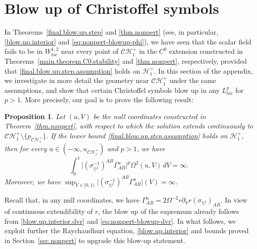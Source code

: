 \documentclass[10pt, reqno]{amsart}
\newtheorem{proposition}[theorem]{Proposition}
\theoremstyle{definition}
\theoremstyle{remark}
\numberwithin{equation}{section}
\newcommand{\abs}[1]{\vert#1\vert}
\newcommand{\set}[1]{\{#1\}}
\newcommand{\rd}{\partial}
\newcommand{\0}{\emptyset}
\newcommand{\Gmm}{\Gamma}
\newcommand{\sgm}{\sigma}
\newcommand{\Omg}{\Omega}
\newcommand{\bbS}{\mathbb S}
\newcommand{\calC}{\mathcal C}
\newcommand{\calH}{\mathcal H}
\newcommand{\CH}{\calC \calH^{+}}		%
\newcommand{\EH}{\calH^{+}}
\begin{document}
\section{Blow up of Christoffel symbols} \label{sec:christoffel}
In Theorems~\ref{final.blow.up.step} and \ref{thm.nonpert} (see, in particular, \eqref{blow.up.interior} and \eqref{eq:nonpert-blowup-phi}), we have seen that the scalar field fails to be in $W^{1,2}_{loc}$ near every point of $\CH_{1}$ in the $C^{0}$ extension constructed in Theorems~\ref{main.theorem.C0.stability} and \ref{thm.nonpert}, respectively, provided that \eqref{final.blow.up.step.assumption} holds on $\EH_{1}$. In this section of the appendix, we investigate in more detail the geometry near $\CH_{1}$ under the same assumptions, and show that certain Christoffel symbols blow up in any $L^{p}_{loc}$ for $p > 1$. More precisely, our goal is to prove the following result:
\begin{proposition} \label{prop:christoffel}
Let $(u, V)$ be the null coordinates constructed in Theorem~\ref{thm.nonpert}, with respect to which the solution extends continuously to $\CH_{1} \setminus \set{p_{\CH_{1}}}$. If the lower bound \eqref{final.blow.up.step.assumption} holds on $\EH_{1}$, then for every $u \in (-\infty, u_{\CH_{1}})$ and $p > 1$, we have 
\begin{equation} \label{eq:christoffel}
	\int_{0}^{1} \abs{(\sgm_{\bbS^{2}}^{-1})^{AB}\Gmm^{u}_{AB}}^{p} \Omg^{2}(u,V) \, d V = \infty.
\end{equation}
Moreover, we have $\sup_{V\in [0,1)} \abs{(\sgm_{\bbS^{2}}^{-1})^{AB}\Gmm^{u}_{AB}}(V) = \infty$.
\end{proposition}
Recall that, in any null coordinates, we have $\Gmm^{u}_{AB} = 2 \Omg^{-2} r \rd_{V} r (\sgm_{\bbS^{2}})_{AB}$. In view of continuous extendibility of $r$, the blow up of the supremum already follows from \eqref{blow.up.interior.dvr} and \eqref{eq:nonpert-blowup-dvr}. In what follows, we exploit further the Raychaudhuri equation, \eqref{blow.up.interior} and bounds proved in Section~\ref{sec.nonpert} to upgrade this blow-up statement.
\end{document}
